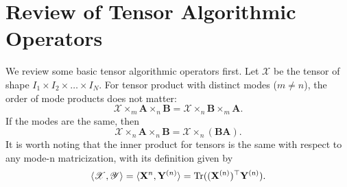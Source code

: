 \section{Review of Tensor Algorithmic Operators}
\label{sec:review_tensor}
We review some basic tensor algorithmic operators first. Let $\mathscr{X}$ be the tensor of shape $I_1\times I_2\times \dots \times I_N$. For tensor product with distinct modes ($m\neq n$), the order of mode products does not matter:
\begin{equation}
\label{eq: tensor_product_mul_exchangable}
\mathscr{X}\times_m \mathbf{A} \times_n \mathbf{B} =    \mathscr{X}\times_n \mathbf{B} \times_m \mathbf{A}. 
\end{equation}
If the modes are the same, then 
\begin{equation}
\label{eq: tensor_product_association}
\mathscr{X}\times_n \mathbf{A} \times_n \mathbf{B} =    \mathscr{X}\times_n (\mathbf{BA}). \end{equation}
It is worth noting that the inner product for tensors is the same with respect to any mode-n matricization, with its definition given by
\begin{equation}
\label{eq:F_norm_equivalent}
\langle \mathscr{X}, \mathscr{Y}\rangle = \langle \mathbf{X}^{n}, \mathbf{Y}^{(n)}\rangle = \rm{Tr}((\mathbf{X}^{(n)})^\top \mathbf{Y}^{(n)}). 
\end{equation}